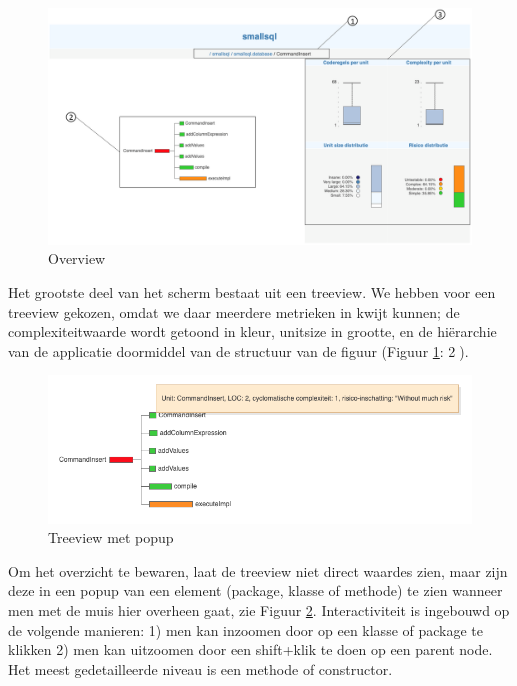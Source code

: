 \documentclass[a4paper]{article}
\begin{document}
\begin{figure}[h]
  \includegraphics[width=\linewidth]{images/overview_with_numbers.png}
  \caption{Overview}
  \label{fig:overview}
\end{figure}
 
Het grootste deel van het scherm bestaat uit een treeview. We hebben voor een treeview gekozen, omdat we daar meerdere metrieken in kwijt kunnen; de complexiteitwaarde wordt getoond in kleur, unitsize in grootte, en de hiërarchie van de applicatie doormiddel van de structuur van de figuur (Figuur \ref{fig:overview}: \textcircled{2}). 
\begin{figure}[h]
  \includegraphics[width=\linewidth]{images/treeview_with_popup.png}
  \caption{Treeview met popup}
  \label{fig:treeview_popup}
\end{figure}
Om het overzicht te bewaren, laat de treeview niet direct waardes zien, maar zijn deze in een popup van een element (package, klasse of methode) te zien wanneer men met de muis hier overheen gaat, zie Figuur \ref{fig:treeview_popup}. Interactiviteit is ingebouwd op de volgende manieren: 1) men kan inzoomen door op een klasse of package te klikken 2) men kan uitzoomen door een shift+klik te doen op een parent node. Het meest gedetailleerde niveau is een methode of constructor.
\end{document}
